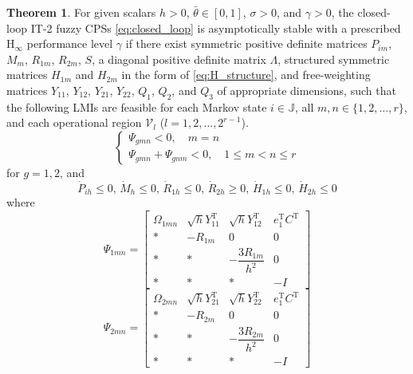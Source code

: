 \documentclass[preprint,review,fleqn,sort&compress,3p]{elsarticle}
\theoremstyle{definition} %
\theoremstyle{definition}%
\newtheorem{thm}{Theorem}[section]
\begin{document}
\begin{thm}\label{thm1}
For given scalars $h>0$, $\bar{\theta}\in[0,1]$, $\sigma>0$, and $\gamma>0$, the closed-loop IT-2 fuzzy CPSs \eqref{eq:closed_loop} is asymptotically stable with a prescribed $\mathrm{H}_\infty$ performance level $\gamma$ if there exist symmetric positive definite matrices
$P_{im}$, $M_m$, $R_{1m}$, $R_{2m}$, $S$, a diagonal positive definite matrix $\Lambda$,
structured symmetric matrices $H_{1m}$ and $H_{2m}$ in the form of \eqref{eq:H_structure},
and free-weighting matrices
$Y_{11}$, $Y_{12}$, $Y_{21}$, $Y_{22}$, $Q_1$, $Q_2$, and $Q_3$
of appropriate dimensions, such that the following LMIs are feasible for each Markov state $i\in\mathbb{J}$, all $m,n\in\{1,2,\ldots,r\}$, and each operational region $\mathcal V_l$ ($l=1,2,\ldots,2^{r-1}$).
\begin{equation}\label{shucr1}
	\begin{cases}
		\Psi_{gmn} < 0 ,\quad  m=n  \\
		\Psi_{gmn} + \Psi_{gnm} < 0,\quad 1 \le m < n \le r
	\end{cases}
\end{equation}
for $g=1,2$, and
\begin{equation}\label{dot_small_0}
	\dot{P}_{ih} \leq 0, \, 
	\dot{M}_{h} \leq 0, \, 
	\dot{R}_{1h} \leq 0, \, 
	\dot{R}_{2h} \geq 0, \, 
	\dot{H}_{1h} \leq 0, \, 
	\dot{H}_{2h} \leq 0
\end{equation}
where
\begin{equation}\label{LMI1}
	\Psi_{1mn} =
	\begin{bmatrix}
		\Omega_{1mn} & \sqrt{h}Y_{11}^{\mathrm{T}} & \sqrt{h}Y_{12}^{\mathrm{T}} & e_1^{\mathrm{T}} C^{\mathrm{T}} \\[1.5ex]
		* & -R_{1m} & 0 & 0  \\[1.5ex]
		* & * & -\dfrac{3R_{1m}}{h^2} & 0 \\[1.5ex]
		* & * & * & -I
	\end{bmatrix}
\end{equation}
\begin{equation}\label{LMI2}
	\Psi_{2mn} =
	\begin{bmatrix}
		\Omega_{2mn} & \sqrt{h}Y_{21}^{\mathrm{T}} & \sqrt{h}Y_{22}^{\mathrm{T}} & e_1^{\mathrm{T}} C^{\mathrm{T}} \\[1.5ex]
		* & -R_{2m} & 0 & 0 \\[1.5ex]
		* & * & -\dfrac{3R_{2m}}{h^2} & 0  \\[1.5ex]
		* & * & * & -I 


\end{bmatrix}
\end{equation}
\end{thm}
\end{document}
